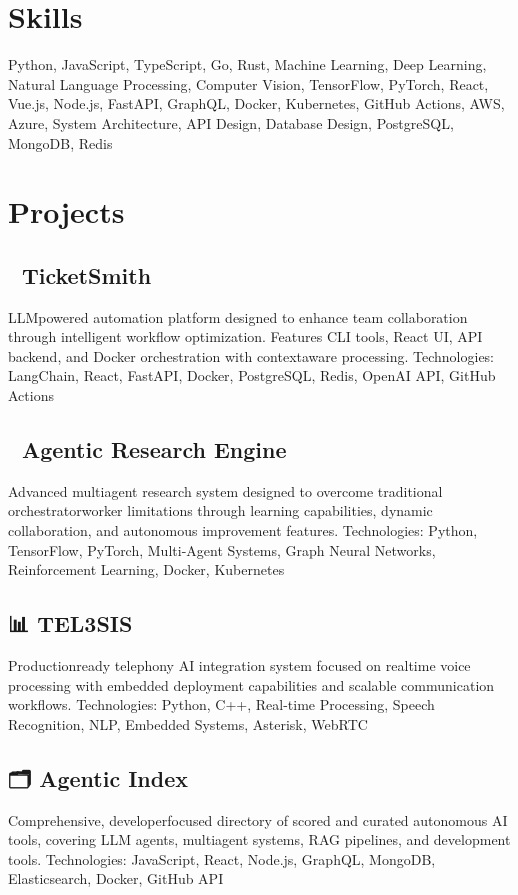 \documentclass{article}
\begin{document}
\section*{Skills}
Python, JavaScript, TypeScript, Go, Rust, Machine Learning, Deep Learning, Natural Language Processing, Computer Vision, TensorFlow, PyTorch, React, Vue.js, Node.js, FastAPI, GraphQL, Docker, Kubernetes, GitHub Actions, AWS, Azure, System Architecture, API Design, Database Design, PostgreSQL, MongoDB, Redis

\section*{Projects}
\subsection*{🎯 TicketSmith}
LLMpowered automation platform designed to enhance team collaboration through intelligent workflow optimization. Features CLI tools, React UI, API backend, and Docker orchestration with contextaware processing.
Technologies: LangChain, React, FastAPI, Docker, PostgreSQL, Redis, OpenAI API, GitHub Actions

\subsection*{🧠 Agentic Research Engine}
Advanced multiagent research system designed to overcome traditional orchestratorworker limitations through learning capabilities, dynamic collaboration, and autonomous improvement features.
Technologies: Python, TensorFlow, PyTorch, Multi-Agent Systems, Graph Neural Networks, Reinforcement Learning, Docker, Kubernetes

\subsection*{📊 TEL3SIS}
Productionready telephony AI integration system focused on realtime voice processing with embedded deployment capabilities and scalable communication workflows.
Technologies: Python, C++, Real-time Processing, Speech Recognition, NLP, Embedded Systems, Asterisk, WebRTC

\subsection*{🗂️ Agentic Index}
Comprehensive, developerfocused directory of scored and curated autonomous AI tools, covering LLM agents, multiagent systems, RAG pipelines, and development tools.
Technologies: JavaScript, React, Node.js, GraphQL, MongoDB, Elasticsearch, Docker, GitHub API
\end{document}
